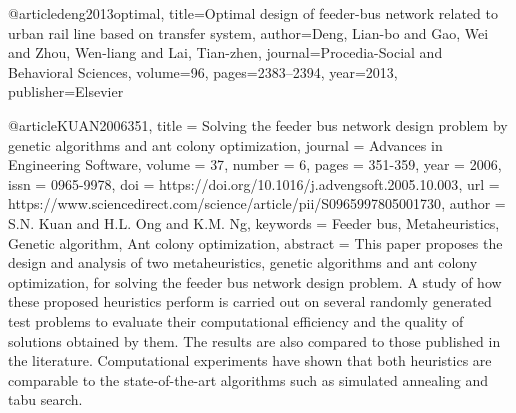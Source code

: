 {@article{deng2013optimal,
  title={Optimal design of feeder-bus network related to urban rail line based on transfer system},
  author={Deng, Lian-bo and Gao, Wei and Zhou, Wen-liang and Lai, Tian-zhen},
  journal={Procedia-Social and Behavioral Sciences},
  volume={96},
  pages={2383--2394},
  year={2013},
  publisher={Elsevier}
}

@article{KUAN2006351,
title = {Solving the feeder bus network design problem by genetic algorithms and ant colony optimization},
journal = {Advances in Engineering Software},
volume = {37},
number = {6},
pages = {351-359},
year = {2006},
issn = {0965-9978},
doi = {https://doi.org/10.1016/j.advengsoft.2005.10.003},
url = {https://www.sciencedirect.com/science/article/pii/S0965997805001730},
author = {S.N. Kuan and H.L. Ong and K.M. Ng},
keywords = {Feeder bus, Metaheuristics, Genetic algorithm, Ant colony optimization},
abstract = {This paper proposes the design and analysis of two metaheuristics, genetic algorithms and ant colony optimization, for solving the feeder bus network design problem. A study of how these proposed heuristics perform is carried out on several randomly generated test problems to evaluate their computational efficiency and the quality of solutions obtained by them. The results are also compared to those published in the literature. Computational experiments have shown that both heuristics are comparable to the state-of-the-art algorithms such as simulated annealing and tabu search.}
}

}
